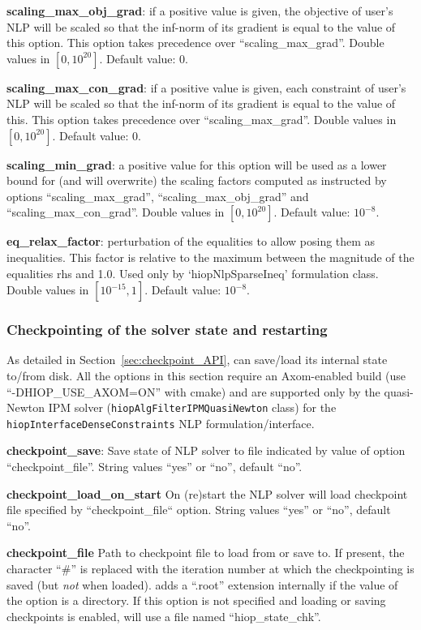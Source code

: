 \noindent \textbf{scaling\_max\_obj\_grad}: if a positive value is given, the objective of user's NLP will be scaled so that the inf-norm of its gradient is equal to the value of this option. This option takes precedence over ``scaling\_max\_grad''. Double values in $[0, 10^{20}]$. Default value: $0$.
\medskip

\noindent \textbf{scaling\_max\_con\_grad}: if a positive value is given, each constraint of user's NLP will be scaled so that the inf-norm of its gradient is equal to the value of this. This option takes precedence over ``scaling\_max\_grad''. Double values in $[0, 10^{20}]$. Default value: $0$.
\medskip

\noindent \textbf{scaling\_min\_grad}: a positive value for this option will be used as a lower bound for (and will overwrite) the scaling factors computed as instructed by options ``scaling\_max\_grad'', ``scaling\_max\_obj\_grad'' and ``scaling\_max\_con\_grad''. Double values in $[0, 10^{20}]$. Default value: $10^{-8}$.
\medskip

\noindent \textbf{eq\_relax\_factor}: perturbation of the equalities to allow posing them as inequalities. This factor is relative to the maximum between the magnitude of the equalities rhs and 1.0. Used only by `hiopNlpSparseIneq' formulation class. Double values in $[10^{-15}, 1]$. Default value: $10^{-8}$.
\medskip


\subsubsection{Checkpointing of the solver state and restarting}\label{sec:checkpoint}
As detailed in Section~\ref{sec:checkpoint_API}, \Hi can save/load its internal state to/from disk. All the options in this section require an Axom-enabled build (use ``-DHIOP\_USE\_AXOM=ON'' with cmake) and are supported only by the quasi-Newton IPM solver (\texttt{hiopAlgFilterIPMQuasiNewton} class) for the \texttt{hiopInterfaceDenseConstraints} NLP formulation/interface.

\noindent \textbf{checkpoint\_save}: Save state of NLP solver to file indicated by value of option ``checkpoint\_file''. String values ``yes'' or ``no'', default ``no''.

\noindent \textbf{checkpoint\_load\_on\_start} On (re)start the NLP solver will load checkpoint file specified by ``checkpoint\_file`` option. String values ``yes'' or ``no'', default ``no''.

\noindent \textbf{checkpoint\_file} Path to checkpoint file to load from or save to. If present, the character ``\#'' is replaced with the iteration number at which the checkpointing is saved (but \textit{not} when loaded). \Hi adds a ``.root'' extension internally if the value of the option is a directory. If this option is not specified and loading or saving checkpoints is enabled, \Hi will use a file named ``hiop\_state\_chk''.

